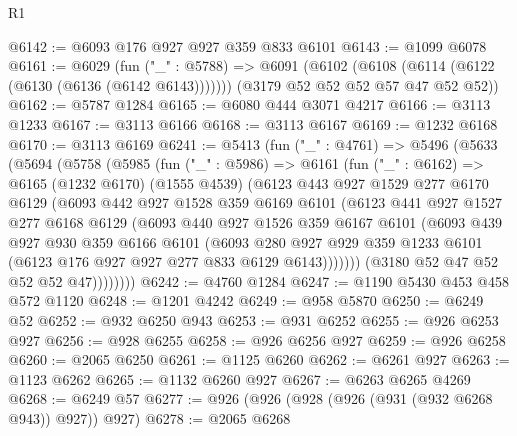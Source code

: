 \begin{lexlean}{R1}
\begin{coremodule}
@6142 := @6093 @176 @927 @927 @359 @833 @6101
@6143 := @1099 @6078
@6161 := @6029
    (fun ("_" : @5788) =>
    @6091
      (@6102 (@6108 (@6114 (@6122 (@6130 (@6136 (@6142 @6143)))))))
      (@3179 @52 @52 @52 @57 @47 @52 @52))
@6162 := @5787 @1284
@6165 := @6080 @444 @3071 @4217
@6166 := @3113 @1233
@6167 := @3113 @6166
@6168 := @3113 @6167
@6169 := @1232 @6168
@6170 := @3113 @6169
@6241 := @5413
    (fun ("_" : @4761) =>
    @5496
      (@5633
        (@5694
          (@5758
            (@5985
              (fun ("_" : @5986) =>
              @6161
                (fun ("_" : @6162) =>
                @6165
                  (@1232 @6170)
                  (@1555 @4539)
                  (@6123
                    @443
                    @927
                    @1529
                    @277
                    @6170
                    @6129
                    (@6093
                      @442
                      @927
                      @1528
                      @359
                      @6169
                      @6101
                      (@6123
                        @441
                        @927
                        @1527
                        @277
                        @6168
                        @6129
                        (@6093
                          @440
                          @927
                          @1526
                          @359
                          @6167
                          @6101
                          (@6093
                            @439
                            @927
                            @930
                            @359
                            @6166
                            @6101
                            (@6093
                              @280
                              @927
                              @929
                              @359
                              @1233
                              @6101
                              (@6123 @176 @927 @927 @277 @833 @6129 @6143)))))))
                  (@3180 @52 @47 @52 @52 @52 @47))))))))
@6242 := @4760 @1284
@6247 := @1190 @5430 @453 @458 @572 @1120
@6248 := @1201 @4242
@6249 := @958 @5870
@6250 := @6249 @52
@6252 := @932 @6250 @943
@6253 := @931 @6252
@6255 := @926 @6253 @927
@6256 := @928 @6255
@6258 := @926 @6256 @927
@6259 := @926 @6258
@6260 := @2065 @6250
@6261 := @1125 @6260
@6262 := @6261 @927
@6263 := @1123 @6262
@6265 := @1132 @6260 @927
@6267 := @6263 @6265 @4269
@6268 := @6249 @57
@6277 := @926 (@926 (@928 (@926 (@931 (@932 @6268 @943)) @927)) @927)
@6278 := @2065 @6268

\end{coremodule}
\end{lexlean}
